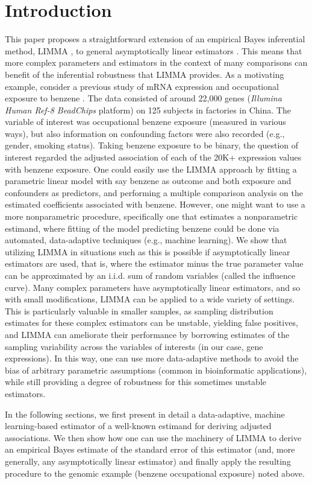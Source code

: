 \chapter{Introduction}

This paper proposes a straightforward extension of an empirical Bayes
inferential method, LIMMA \cite{smyth2004linear}, to general asymptotically
linear estimators \cite{tsiatis2007semiparametric,van2011targeted}. This means
that more complex parameters and estimators in the context of many comparisons
can benefit of the inferential robustness that LIMMA provides. As a motivating
example, consider a previous study of mRNA expression and occupational exposure
to benzene \cite{mchale2011global}. The data consisted of around 22,000 genes
(\textit{Illumina Human Ref-8 BeadChips} platform) on 125  subjects in factories
in China. The variable of interest was occupational benzene exposure (measured
in various ways), but also information on confounding factors were also recorded
(e.g., gender, smoking status). Taking benzene exposure to be binary, the
question of interest regarded the adjusted association of each of the 20K+
expression values with benzene exposure. One could easily use the LIMMA approach
by fitting a parametric linear model with say benzene as outcome and both
exposure and confounders as predictors, and performing a multiple comparison
analysis on the estimated coefficients associated with benzene. However, one
might want to use a more nonparametric procedure, specifically one that
estimates a nonparametric estimand, where fitting of the model predicting
benzene could be done via automated, data-adaptive techniques (e.g., machine
learning). We show that utilizing LIMMA in situations such as this is possible
if asymptotically linear estimators are used, that is, where the estimator minus
the true parameter value can be approximated by an i.i.d. sum of random
variables (called the influence curve). Many complex parameters have
asymptotically linear estimators, and so with small modifications, LIMMA can be
applied to a wide variety of settings. This is particularly valuable in smaller
samples, as sampling distribution estimates for these complex estimators can be
unstable, yielding false positives, and LIMMA can ameliorate their performance
by borrowing estimates of the sampling variability across the variables of
interests (in our case, gene expressions). In this way, one can use more
data-adaptive methods to avoid the bias of arbitrary parametric assumptions
(common in bioinformatic applications), while still providing a degree of
robustness for this sometimes unstable estimators.

In the following sections, we first present in detail a data-adaptive, machine
learning-based estimator of a well-known estimand for deriving adjusted
associations. We then show how one can use the machinery of LIMMA to derive an
empirical Bayes estimate of the standard error of this estimator (and, more
generally, any asymptotically linear estimator) and finally apply the resulting
procedure to the genomic example (benzene occupational exposure) noted above.
